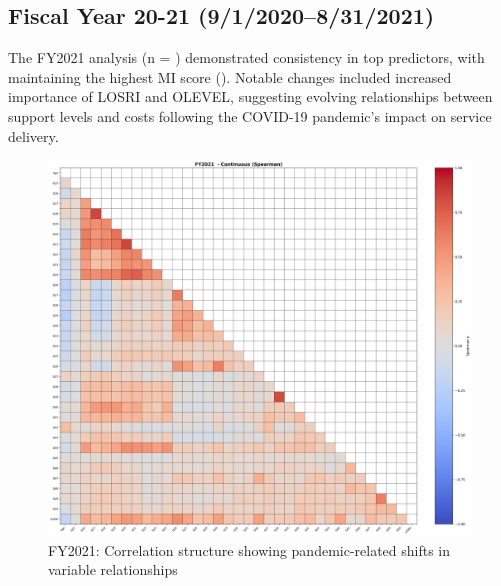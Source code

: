 \newpage

\subsection{Fiscal Year 20-21 (9/1/2020--8/31/2021)}

The FY2021 analysis (n = \FSRecordsFinalFYTwoThousandTwentyOne) demonstrated consistency in top predictors, with \FSTopFeatureFYTwoThousandTwentyOne{} maintaining the highest MI score (\FSTopMIFYTwoThousandTwentyOne). Notable changes included increased importance of LOSRI and OLEVEL, suggesting evolving relationships between support levels and costs following the COVID-19 pandemic's impact on service delivery.

\vspace*{\fill}
\begin{figure}[htbp]
\centering
\includegraphics[width=\textwidth]{fy2021_continuous_spearman.png}
\caption{FY2021: Correlation structure showing pandemic-related shifts in variable relationships}
\end{figure}
\vspace*{\fill}

\newpage

